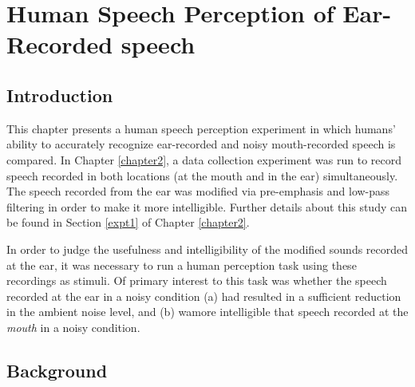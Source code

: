 % 
% 
% 

\chapter{Human Speech Perception of Ear-Recorded speech\label{chapter3}}


\section{Introduction}\label{chap3:introduction}

This chapter presents a human speech perception experiment in which humans' ability to accurately recognize ear-recorded and noisy mouth-recorded speech is compared.  In Chapter \ref{chapter2}, a data collection experiment was run to record speech recorded in both locations (at the mouth and in the ear) simultaneously.  The speech recorded from the ear was modified via pre-emphasis and low-pass filtering in order to make it more intelligible.  Further details about this study can be found in Section \ref{expt1} of Chapter \ref{chapter2}.

In order to judge the usefulness and intelligibility of the modified sounds recorded at the ear, it was necessary to run a human perception task using these recordings as stimuli.  Of primary interest to this task was whether the speech recorded at the ear in a noisy condition (a) had resulted in a sufficient reduction in the ambient noise level, and (b) wamore intelligible that speech recorded at the \textit{mouth} in a noisy condition.

\section{Background}\label{chap3:background}

